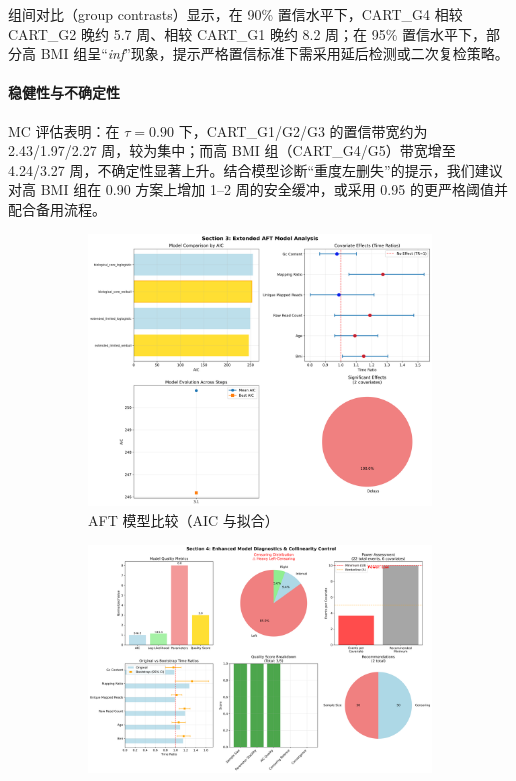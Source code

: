 \documentclass[withoutpreface]{cumcmthesis}
\begin{document}
组间对比（group contrasts）显示，在 90\% 置信水平下，CART\_G4 相较 CART\_G2 晚约 \num{5.7} 周、相较 CART\_G1 晚约 \num{8.2} 周；在 95\% 置信水平下，部分高 BMI 组呈“\textit{inf}”现象，提示严格置信标准下需采用延后检测或二次复检策略。

\paragraph{稳健性与不确定性} MC 评估表明：在 $\tau=0.90$ 下，CART\_G1/G2/G3 的置信带宽约为 \num{2.43}/\num{1.97}/\num{2.27} 周，较为集中；而高 BMI 组（CART\_G4/G5）带宽增至 \num{4.24}/\num{3.27} 周，不确定性显著上升。结合模型诊断“重度左删失”的提示，我们建议对高 BMI 组在 0.90 方案上增加 1–2 周的安全缓冲，或采用 0.95 的更严格阈值并配合备用流程。

\begin{figure}[htbp]
\centering
\begin{subfigure}{0.48\textwidth}
  \centering
  \includegraphics[width=\linewidth]{output/figures/p3_section3_aft_model_analysis.png}
  \caption{AFT 模型比较（AIC 与拟合）}
\end{subfigure}\hfill
\begin{subfigure}{0.48\textwidth}
  \centering
  \includegraphics[width=\linewidth]{output/figures/p3_section4_model_diagnostics.png}

\end{subfigure}
\end{figure}
\end{document}
